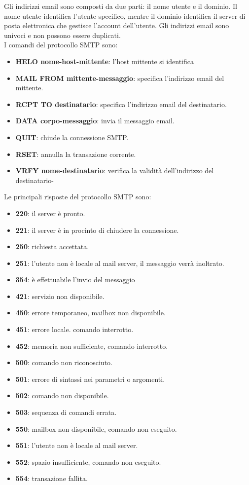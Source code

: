 \documentclass[12pt]{report}
\begin{document}
	Gli indirizzi email sono composti da due parti: il nome utente e il dominio. Il nome utente identifica l'utente specifico, mentre il dominio identifica il server di posta elettronica che gestisce l'account dell'utente. Gli indirizzi email sono univoci e non possono essere duplicati. 
	\vspace{\baselineskip}\\
	I comandi del protocollo SMTP sono:
	\begin{itemize}
		\item \textbf{HELO nome-host-mittente}: l'host mittente si identifica
		\item \textbf{MAIL FROM mittente-messaggio}: specifica l'indirizzo email del mittente.
		\item \textbf{RCPT TO destinatario}: specifica l'indirizzo email del destinatario.
		\item \textbf{DATA corpo-messaggio}: invia il messaggio email.
		\item \textbf{QUIT}: chiude la connessione SMTP.
		\item \textbf{RSET}: annulla la transazione corrente.
		\item \textbf{VRFY nome-destinatario}: verifica la validità dell'indirizzo del destinatario-
	\end{itemize}
	Le principali risposte del protocollo SMTP sono:
	\begin{itemize}
		\item \textbf{220}: il server è pronto.
		\item \textbf{221}: il server è in procinto di chiudere la connessione.
		\item \textbf{250}: richiesta accettata.
		\item \textbf{251}: l'utente non è locale al mail server, il messaggio verrà inoltrato.
		\item \textbf{354}: è effettuabile l'invio del messaggio
		\item \textbf{421}: servizio non disponibile.
		\item \textbf{450}: errore temporaneo, mailbox non disponibile.
		\item \textbf{451}: errore locale. comando interrotto.
		\item \textbf{452}: memoria non sufficiente, comando interrotto.
		\item \textbf{500}: comando non riconosciuto.
		\item \textbf{501}: errore di sintassi nei parametri o argomenti.
		\item \textbf{502}: comando non disponibile.
		\item \textbf{503}: sequenza di comandi errata.
		\item \textbf{550}: mailbox non disponibile, comando non eseguito.
		\item \textbf{551}: l'utente non è locale al mail server.
		\item \textbf{552}: spazio insufficiente, comando non eseguito.
		\item \textbf{554}: transazione fallita.
	\end{itemize}
\end{document}
